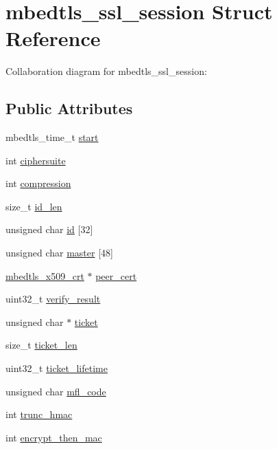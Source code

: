 \hypertarget{structmbedtls__ssl__session}{}\section{mbedtls\+\_\+ssl\+\_\+session Struct Reference}
\label{structmbedtls__ssl__session}


Collaboration diagram for mbedtls\+\_\+ssl\+\_\+session\+:
\subsection*{Public Attributes}
\begin{DoxyCompactItemize}
\item 
mbedtls\+\_\+time\+\_\+t \mbox{\hyperlink{structmbedtls__ssl__session_a9471fce28f119353d9b3c3e738d51bcb}{start}}
\item 
int \mbox{\hyperlink{structmbedtls__ssl__session_ad91239f4186bd272e3eb441c9c309b9e}{ciphersuite}}
\item 
int \mbox{\hyperlink{structmbedtls__ssl__session_a71b31d138a01adef0ef99f03084da801}{compression}}
\item 
size\+\_\+t \mbox{\hyperlink{structmbedtls__ssl__session_ad1bc5443b7ac77eadd1df71a69f18ba6}{id\+\_\+len}}
\item 
unsigned char \mbox{\hyperlink{structmbedtls__ssl__session_abd00d63c5fe4ae5dd87cbba60155fbc4}{id}} \mbox{[}32\mbox{]}
\item 
unsigned char \mbox{\hyperlink{structmbedtls__ssl__session_ae8adb932e053a2179530a8aff8750624}{master}} \mbox{[}48\mbox{]}
\item 
\mbox{\hyperlink{structmbedtls__x509__crt}{mbedtls\+\_\+x509\+\_\+crt}} $\ast$ \mbox{\hyperlink{structmbedtls__ssl__session_a2133d1643e524378f074bd9da89aca42}{peer\+\_\+cert}}
\item 
uint32\+\_\+t \mbox{\hyperlink{structmbedtls__ssl__session_a7767cf999b47eaa545fb6a86b3447a20}{verify\+\_\+result}}
\item 
unsigned char $\ast$ \mbox{\hyperlink{structmbedtls__ssl__session_ad639f04ea53fe3602f1188967187436f}{ticket}}
\item 
size\+\_\+t \mbox{\hyperlink{structmbedtls__ssl__session_a381594bf55513430e6c61bf287baf38b}{ticket\+\_\+len}}
\item 
uint32\+\_\+t \mbox{\hyperlink{structmbedtls__ssl__session_a0d6aad183f79d64f7eee544cd5277be2}{ticket\+\_\+lifetime}}
\item 
unsigned char \mbox{\hyperlink{structmbedtls__ssl__session_a9eb94cea53e9e6cb74e6f4204aee0a72}{mfl\+\_\+code}}
\item 
int \mbox{\hyperlink{structmbedtls__ssl__session_ad782325576a5b4c06bf55e2b9f2c7bcc}{trunc\+\_\+hmac}}
\item 
int \mbox{\hyperlink{structmbedtls__ssl__session_ac0ac3fa9cca796f14ae26cfbeb28e807}{encrypt\+\_\+then\+\_\+mac}}
\end{DoxyCompactItemize}


